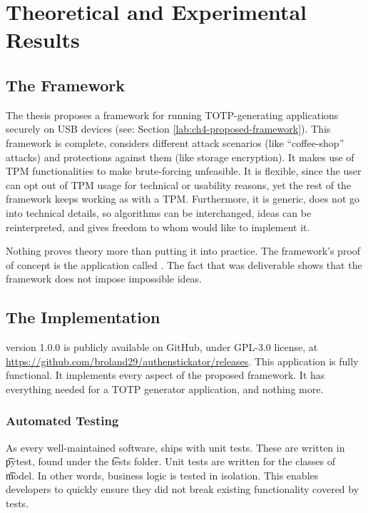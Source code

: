 \chapter{Theoretical and Experimental Results} \label{ch5-theoretical-and-experimental-results}

\section{The Framework}

The thesis proposes a framework for running TOTP-generating applications securely on USB devices (see: Section \ref{lab:ch4-proposed-framework}).
This framework is complete, considers different attack scenarios (like ``coffee-shop'' attacks) and protections against them (like storage encryption).
It makes use of TPM functionalities to make brute-forcing unfeasible.
It is flexible, since the user can opt out of TPM usage for technical or usability reasons, yet the rest of the framework keeps working as with a TPM.
Furthermore, it is generic, does not go into technical details, so algorithms can be interchanged, ideas can be reinterpreted, and gives freedom to whom would like to implement it. 

Nothing proves theory more than putting it into practice.
The framework's proof of concept is the application called \app{}.
The fact that \app{} was deliverable shows that the framework does not impose impossible ideas.



\section{The Implementation}

\app{} version 1.0.0 is publicly available on GitHub, under GPL-3.0 license, at \url{https://github.com/broland29/authenstickator/releases}.
This application is fully functional.
It implements every aspect of the proposed framework.
It has everything needed for a TOTP generator application, and nothing more.



\subsection{Automated Testing}

As every well-maintained software, \app{} ships with unit tests.
These are written in \t{pytest}, found under the \t{tests} folder.
Unit tests are written for the classes of \t{model}.
In other words, business logic is tested in isolation.
This enables developers to quickly ensure they did not break existing functionality covered by tests.

